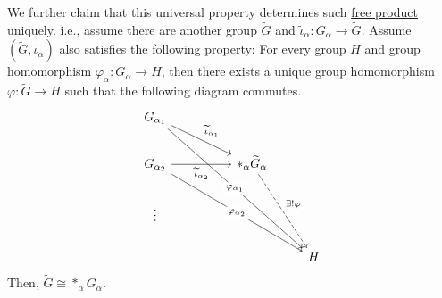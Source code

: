 \begin{remark}
	We further claim that this universal property determines such \hyperref[def:free-product]{free product} uniquely. i.e., assume there are another group \(\widetilde{G} \) and
	\(\widetilde{\iota} _\alpha \colon G_\alpha \to \widetilde{G}\). Assume \((\widetilde{G} , \widetilde{\iota} _\alpha  )\) also satisfies the following property: For every
	group \(H\) and group homomorphism \(\varphi _\alpha \colon G_\alpha \to H\), then there exists a unique group homomorphism \(\varphi \colon \widetilde{G} \to H\) such that
	the following diagram commutes.
	\[
		\begin{tikzcd}
			{G_{\alpha_1}} \\
			{G_{\alpha_2}} && {\ast_\alpha \widetilde{G} _\alpha} \\
			\vdots \\
			&&& H
			\arrow["{\widetilde{\iota}_{\alpha_1}}", from=1-1, to=2-3]
			\arrow["{\widetilde{\iota}_{\alpha_2}}"', from=2-1, to=2-3]
			\arrow["{\exists ! \varphi}", dashed, from=2-3, to=4-4]
			\arrow["{\varphi_{\alpha_1}}"{description}, from=1-1, to=4-4]
			\arrow["{\varphi_{\alpha_2}}"{description}, from=2-1, to=4-4]
		\end{tikzcd}
	\]
	Then, \(\widetilde{G} \cong \ast_\alpha G_\alpha \).
\end{remark}

